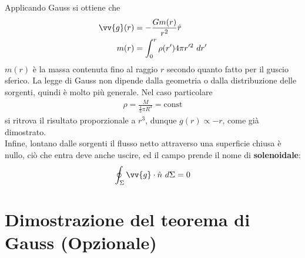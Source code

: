 \documentclass[a4paper, oneside]{book}
\begin{document}
Applicando Gauss si ottiene che
\begin{align}
    \vv{g}(r) &= - \frac{Gm(r)}{r^{2}} \hat{r}  \\
    m(r) &= \int_{0}^{r} \rho(r') 4\pi r'^{2} \ dr'  
\end{align}
$m(r)$ è la massa contenuta fino al raggio $r$ secondo quanto 
fatto per il guscio sferico. La legge di Gauss non dipende dalla geometria 
o dalla distribuzione delle sorgenti, quindi è molto più 
generale. Nel caso particolare 
\begin{gather*}
    \rho = \frac{M}{\frac{4}{3}\pi R^{3}} = \text{const} 
\end{gather*}
si ritrova il risultato proporzionale a $r^{3}$, dunque $g(r) \propto - r$, come già dimostrato. \\
Infine, lontano dalle sorgenti il flusso netto attraverso una superficie 
chiusa è nullo, ciò che entra deve anche uscire, ed il campo 
prende il nome di \textbf{solenoidale}:
\begin{align}
    \oint_\Sigma \vv{g} \cdot \hat{n} \ d\Sigma = 0  
\end{align}

\section{Dimostrazione del teorema di Gauss (Opzionale)}
\end{document}
